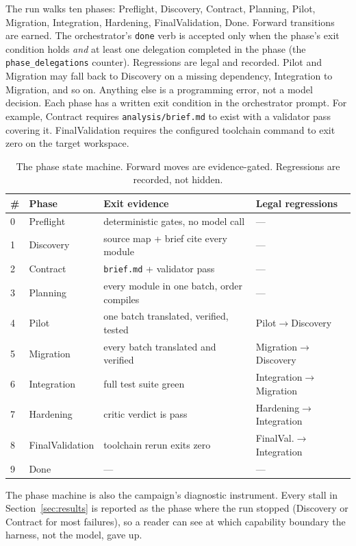 \documentclass[11pt]{article}
\begin{document}
The run walks ten phases: \textsf{Preflight}, \textsf{Discovery},
\textsf{Contract}, \textsf{Planning}, \textsf{Pilot}, \textsf{Migration},
\textsf{Integration}, \textsf{Hardening}, \textsf{FinalValidation},
\textsf{Done}. Forward transitions are earned. The orchestrator's
\texttt{done} verb is accepted only when the phase's exit condition holds
\emph{and} at least one delegation completed in the phase (the
\texttt{phase\_delegations} counter). Regressions are legal and recorded.
\textsf{Pilot} and \textsf{Migration} may fall back to \textsf{Discovery}
on a missing dependency, \textsf{Integration} to \textsf{Migration}, and
so on. Anything else is a programming error, not a model decision. Each
phase has a written exit condition in the orchestrator prompt. For example,
\textsf{Contract} requires \texttt{analysis/brief.md} to exist with a
validator pass covering it. \textsf{FinalValidation} requires the
configured toolchain command to exit zero on the target workspace.

\begin{table}[ht]
\centering
\begin{tabular}{llll}
\toprule
\# & Phase & Exit evidence & Legal regressions \\
\midrule
0 & Preflight & deterministic gates, no model call & --- \\
1 & Discovery & source map + brief cite every module & --- \\
2 & Contract & \texttt{brief.md} + validator pass & --- \\
3 & Planning & every module in one batch, order compiles & --- \\
4 & Pilot & one batch translated, verified, tested & Pilot$\to$Discovery \\
5 & Migration & every batch translated and verified & Migration$\to$Discovery \\
6 & Integration & full test suite green & Integration$\to$Migration \\
7 & Hardening & critic verdict is pass & Hardening$\to$Integration \\
8 & FinalValidation & toolchain rerun exits zero & FinalVal.$\to$Integration \\
9 & Done & --- & --- \\
\bottomrule
\end{tabular}
\caption{The phase state machine. Forward moves are evidence-gated.
Regressions are recorded, not hidden.}
\label{tab:phases}
\end{table}

The phase machine is also the campaign's diagnostic instrument. Every
stall in Section~\ref{sec:results} is reported as the phase where the run
stopped (\textsf{Discovery} or \textsf{Contract} for most failures), so a
reader can see at which capability boundary the harness, not the model,
gave up.
\end{document}
